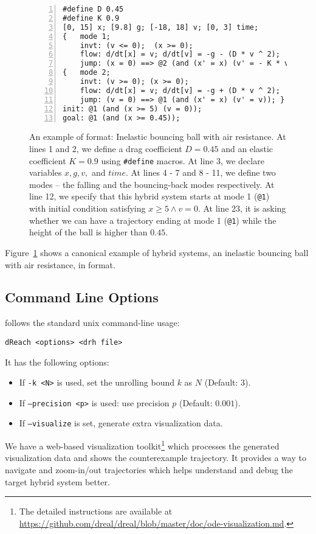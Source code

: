 \begin{figure}
  \centering
  \begin{Verbatim}[fontfamily=courier, frame=single, framesep=1mm,
  numbers=left, fontsize=\scriptsize]
#define D 0.45
#define K 0.9
[0, 15] x; [9.8] g; [-18, 18] v; [0, 3] time;
{   mode 1;
    invt: (v <= 0);  (x >= 0);
    flow: d/dt[x] = v; d/dt[v] = -g - (D * v ^ 2);
    jump: (x = 0) ==> @2 (and (x' = x) (v' = - K * v)); }
{   mode 2;
    invt: (v >= 0); (x >= 0);
    flow: d/dt[x] = v; d/dt[v] = -g + (D * v ^ 2);
    jump: (v = 0) ==> @1 (and (x' = x) (v' = v)); }
init: @1 (and (x >= 5) (v = 0));
goal: @1 (and (x >= 0.45));
\end{Verbatim}
\caption{An example of \drh{} format: Inelastic bouncing ball with air
  resistance. At lines 1 and 2, we define a drag coefficient $D = 0.45$
  and an elastic coefficient $K = 0.9$ using \texttt{\#define} macros.
  At line 3, we declare variables $x, g, v,$ and $time$. At lines
  4 - 7 and 8 - 11, we define two modes -- the falling and the
  bouncing-back modes respectively. At line 12, we specify
  that this hybrid system starts at mode 1 (\texttt{@1}) with initial
  condition satisfying $x \ge 5 \land v = 0$. At line 23, it
  is asking whether we can have a trajectory ending at mode 1
  (\texttt{@1}) while the height of the ball is higher than $0.45$.}
\label{fig:bouncing-ball-drh}
\end{figure}
\vspace{-0.1cm}
Figure~\ref{fig:bouncing-ball-drh} shows a canonical example of hybrid
systems, an inelastic bouncing ball with air resistance, in \drh{}
format.

\subsection{Command Line Options}
\dReach{} follows the standard unix command-line usage:
\begin{Verbatim}[fontfamily=courier, framesep=1mm, fontsize=\small]
dReach <options> <drh file>
\end{Verbatim}
It has the following options:
\begin{itemize}
\item If \texttt{-k <N>} is used, set the unrolling bound $k$ as $N$ (Default: 3).
\item If \texttt{--precision <p>} is used: use precision $p$ (Default: $0.001$).
\item If \texttt{--visualize} is set, \dReach{} generate extra visualization data.
\end{itemize}
We have a web-based visualization toolkit\footnote{The detailed
  instructions are available at
  \url{https://github.com/dreal/dreal/blob/master/doc/ode-visualization.md}.}
which processes the generated visualization data and shows the
counterexample trajectory. It provides a way to navigate and
zoom-in/out trajectories which helps understand and debug the target
hybrid system better.

